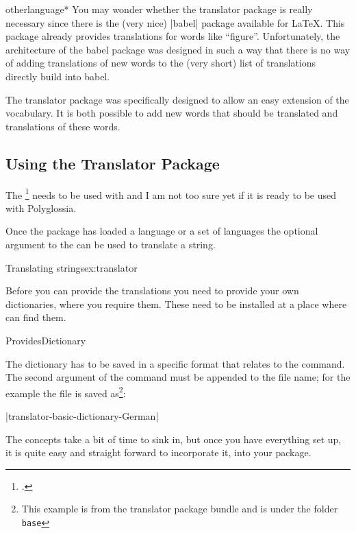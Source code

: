 \begin{docCommandd}{otherlanguage*} { }
You may wonder whether the translator package is really necessary
since there is the (very nice) |babel| package available for
\LaTeX. This package already provides translations for words like
``figure''. Unfortunately, the architecture of the babel package was
designed in such a way that there is no way of adding translations of
new words to the (very short) list of translations directly build into
babel.

The translator package was specifically designed to allow an easy
extension of the vocabulary. It is both possible to add new words that
should be translated and translations of these words.

\subsection{Using the Translator Package}

  The \footcite{translator} needs to be used with  and I am not too sure yet 
  if it is ready  to be used with Polyglossia.

Once the package has loaded a language or a set of languages the optional argument to the
\cmd{\translate} can be used to translate a string. 

\begin{texexample}{Translating strings}{ex:translator}
\end{texexample}

Before you can provide the translations you need to provide your own dictionaries, where you require them. These need to be installed at a place where \tex can find them.

\begin{docCmd} {ProvidesDictionary} {   }
\end{docCmd}

The dictionary has to be saved in a specific format that relates to the  command. The second argument of the command must be appended to the file name; for the example the file is saved as\footnote{This  example is from the translator package bundle and is under the folder \texttt{base}}:

|translator-basic-dictionary-German|

The concepts take a bit of time to sink in, but once you have everything set up, it is quite easy and straight forward to incorporate it, into your package. 


\end{docCommandd}
